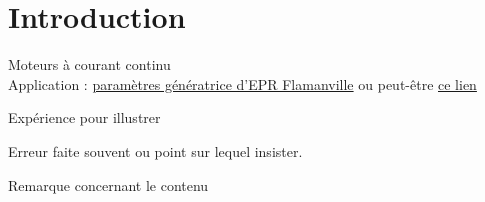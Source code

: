 


\biblio{}

\section*{Introduction}


Moteurs à courant continu \\

Application : \href{ge.com/content/dam/gepower-nuclear/global/en_US/documents/Nuclear-Product-Catalog.pdf}{paramètres génératrice d'EPR Flamanville} ou peut-être \href{https://stage.geready.com/content/dam/gepower-pw/global/en_US/documents/alstom/gea31902-nuclear-turbine-island-solutions-29-10-15.pdf}{ce lien}







\begin{experience}
	Expérience pour illustrer
\end{experience}

\begin{attention}
	Erreur faite souvent ou point sur lequel insister.
\end{attention}


\begin{remarques}
	Remarque concernant le contenu
\end{remarques}